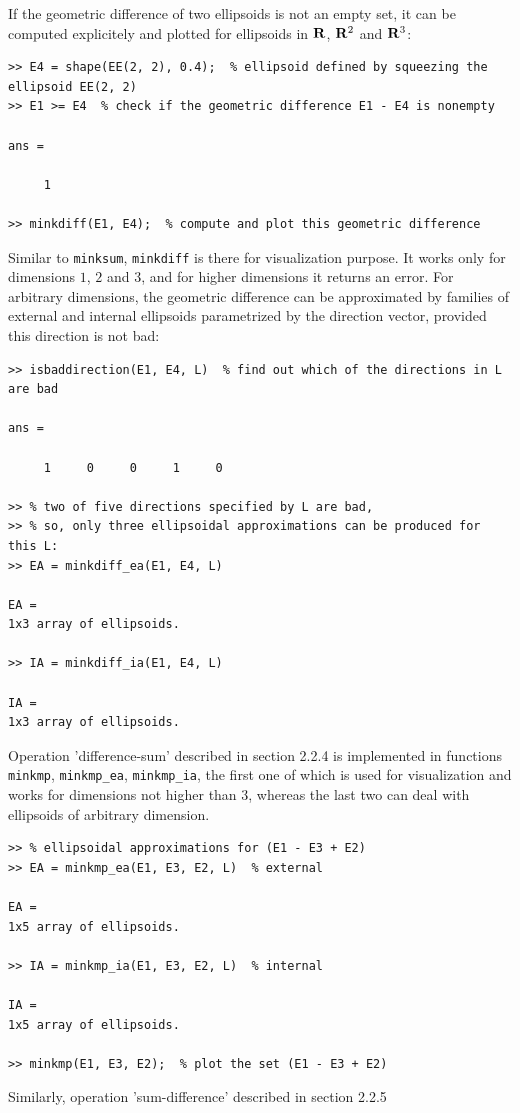 \documentclass{report}
\begin{document}
If the geometric difference of two ellipsoids is not an empty set, it can
be computed explicitely and plotted for ellipsoids in ${\bf R}$,
${\bf R}^2$ and ${\bf R}^3$:
{\tt \begin{verbatim}
>> E4 = shape(EE(2, 2), 0.4);  % ellipsoid defined by squeezing the ellipsoid EE(2, 2)
>> E1 >= E4  % check if the geometric difference E1 - E4 is nonempty

ans =

     1

>> minkdiff(E1, E4);  % compute and plot this geometric difference
\end{verbatim} }
Similar to {\tt minksum}, {\tt minkdiff} is there for visualization
purpose. It works only for dimensions $1$, $2$ and $3$, and for higher
dimensions it returns an error. For arbitrary dimensions, the geometric
difference can be approximated by  families of external and internal
ellipsoids parametrized by the direction vector, provided this direction
is not bad:
{\tt \begin{verbatim}
>> isbaddirection(E1, E4, L)  % find out which of the directions in L are bad

ans =

     1     0     0     1     0

>> % two of five directions specified by L are bad,
>> % so, only three ellipsoidal approximations can be produced for this L:
>> EA = minkdiff_ea(E1, E4, L)

EA =
1x3 array of ellipsoids.

>> IA = minkdiff_ia(E1, E4, L)

IA =
1x3 array of ellipsoids.
\end{verbatim} }
Operation 'difference-sum' described in section 2.2.4 is implemented in
functions {\tt minkmp}, {\tt minkmp\_ea}, {\tt minkmp\_ia}, the first one of
which is used for visualization and works for dimensions not higher than $3$,
whereas the last two can deal with ellipsoids of arbitrary dimension.
{\tt \begin{verbatim}
>> % ellipsoidal approximations for (E1 - E3 + E2)
>> EA = minkmp_ea(E1, E3, E2, L)  % external

EA =
1x5 array of ellipsoids.

>> IA = minkmp_ia(E1, E3, E2, L)  % internal

IA =
1x5 array of ellipsoids.

>> minkmp(E1, E3, E2);  % plot the set (E1 - E3 + E2)
\end{verbatim} }
Similarly, operation 'sum-difference' described in section 2.2.5
\end{document}
